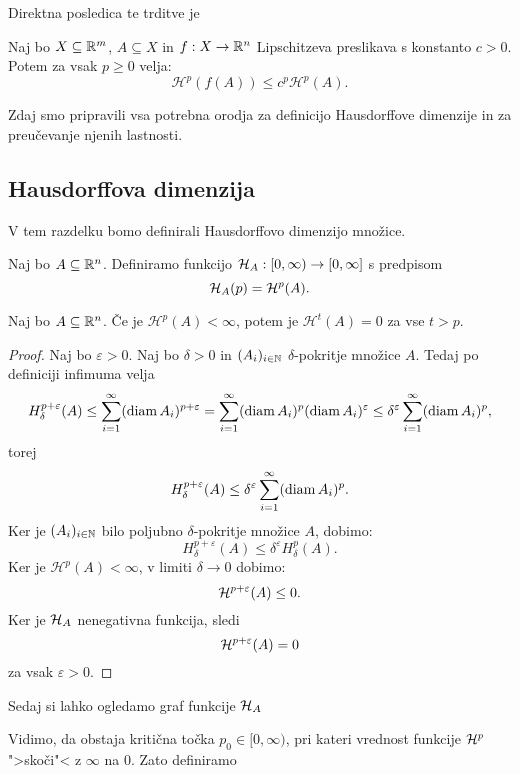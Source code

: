 Direktna posledica te trditve je 
\begin{posledica}
    Naj bo \(X \subseteq \mathbb{R}^m\), \(A \subseteq X\) in \(f: X \to \mathbb{R}^n\) Lipschitzeva preslikava s konstanto \(c > 0\). Potem za vsak \(p \geq 0\) velja:
    \[\mathcal{H}^{p}(f(A)) \leq c^p \mathcal{H}^p(A).\]
\end{posledica}

Zdaj smo pripravili vsa potrebna orodja za definicijo Hausdorffove dimenzije in za preučevanje njenih lastnosti.

\subsection{Hausdorffova dimenzija}
V tem razdelku bomo definirali Hausdorffovo dimenzijo množice.

Naj bo \(A \subseteq \mathbb{R}^n\). Definiramo funkcijo \(\mathcal{H}_A: [0, \infty) \to [0, \infty]\) s predpisom 
\[\mathcal{H}_A(p) = \mathcal{H}^p(A).\]
\begin{lema}
    Naj bo \(A \subseteq \mathbb{R}^n\). Če je \(\mathcal{H}^{p}(A) < \infty\), potem je \(\mathcal{H}^{t}(A) = 0\) za vse \(t > p\).
\end{lema}

\begin{proof}
    Naj bo \(\varepsilon > 0\). Naj bo \(\delta > 0\) in \((A_i)_{i \in \mathbb{N}}\) \(\delta\)-pokritje množice \(A\). Tedaj po definiciji infimuma velja
    \[H^{p + \varepsilon}_\delta(A) \leq \sum_{i=1}^{\infty} (\operatorname{diam} A_i)^{p + \varepsilon} = \sum_{i=1}^{\infty} (\operatorname{diam} A_i)^{p} (\operatorname{diam} A_i)^{\varepsilon} \leq \delta^{\varepsilon} \sum_{i=1}^{\infty} (\operatorname{diam} A_i)^{p},\]
    torej 
    \[H^{p + \varepsilon}_\delta(A) \leq \delta^{\varepsilon} \sum_{i=1}^{\infty} (\operatorname{diam} A_i)^{p}.\]
    Ker je \((A_i)_{i \in \mathbb{N}}\) bilo poljubno \(\delta\)-pokritje množice \(A\), dobimo:
    \[H^{p + \varepsilon}_\delta(A) \leq \delta^{\varepsilon} H^{p}_\delta(A).\]
    Ker je \(\mathcal{H}^{p}(A) < \infty\), v limiti \(\delta \to 0\) dobimo:
    \[\mathcal{H}^{p + \varepsilon}(A) \leq 0.\]
    Ker je \(\mathcal{H}_A\) nenegativna funkcija, sledi
    \[\mathcal{H}^{p + \varepsilon}(A) = 0\]
    za vsak \(\varepsilon > 0\).
\end{proof}

Sedaj si lahko ogledamo graf funkcije \(\mathcal{H}_A\)
\begin{center}
    \drawGraf
\end{center}
Vidimo, da obstaja kritična točka \(p_0 \in [0, \infty)\), pri kateri vrednost funkcije \(\mathcal{H}^p\) ">skoči"< z \(\infty\) na \(0\). Zato definiramo

